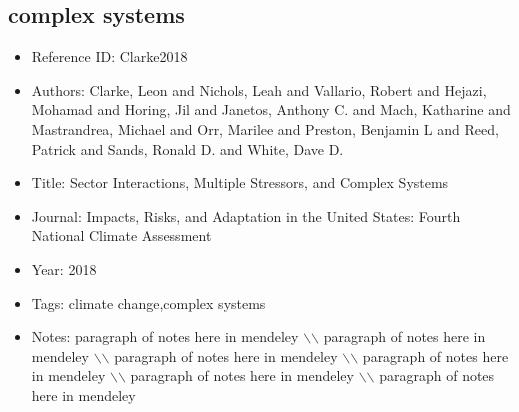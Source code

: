 \documentclass[11pt]{article}
\begin{document}
\subsection{complex systems} 
\noindent\citep{Clarke2018} 
\begin{itemize} 
\item{Reference ID:  Clarke2018} 

\item{Authors:  Clarke, Leon and Nichols, Leah and Vallario, Robert and Hejazi, Mohamad and Horing, Jil and Janetos, Anthony C. and Mach, Katharine and Mastrandrea, Michael and Orr, Marilee and Preston, Benjamin L and Reed, Patrick and Sands, Ronald D. and White, Dave D.} 

\item{Title:  Sector Interactions, Multiple Stressors, and Complex Systems} 

\item{Journal:  Impacts, Risks, and Adaptation in the United States: Fourth National Climate Assessment} 

\item{Year:  2018} 

\item{Tags:  climate change,complex systems} 

\item{Notes:  paragraph of notes here in mendeley $\backslash$$\backslash$ paragraph of notes here in mendeley $\backslash$$\backslash$ paragraph of notes here in mendeley $\backslash$$\backslash$ paragraph of notes here in mendeley $\backslash$$\backslash$ paragraph of notes here in mendeley $\backslash$$\backslash$ paragraph of notes here in mendeley} 

\end{itemize}\medskip
\end{document}
